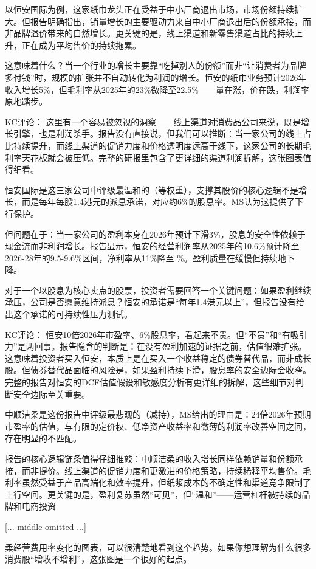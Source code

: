 \documentclass[11pt]{ctexart}
\begin{document}
以恒安国际为例，这家纸巾龙头正在受益于中小厂商退出市场，市场份额持续扩大。但报告明确指出，销量增长的主要驱动力来自中小厂商退出后的份额承接，而非品牌溢价带来的自然增长。更关键的是，线上渠道和新零售渠道占比的持续上升，正在成为平均售价的持续拖累。

这意味着什么？当一个行业的增长主要靠“吃掉别人的份额”而非“让消费者为品牌多付钱”时，规模的扩张并不自动转化为利润的增长。恒安的纸巾业务预计2026年收入增长5\%，但毛利率从2025年的23\%微降至22.5\%——量在涨，价在跌，利润率原地踏步。

KC评论： 这里有一个容易被忽视的洞察——线上渠道对消费品公司来说，既是增长引擎，也是利润杀手。报告没有直接说，但我们可以推断：当一家公司的线上占比持续提升，而线上渠道的促销力度和价格透明度远高于线下，这家公司的长期毛利率天花板就会被压低。完整的研报里包含了更详细的渠道利润拆解，这张图表值得细看。

恒安国际是这三家公司中评级最温和的（等权重），支撑其股价的核心逻辑不是增长，而是每年每股1.4港元的派息承诺，对应约6\%的股息率。MS认为这提供了下行保护。

但问题在于：当一家公司的盈利本身在2026年预计下滑3\%，股息的安全性依赖于现金流而非利润增长。报告显示，恒安的经营利润率从2025年的10.6\%预计降至2026-28年的9.5-9.6\%区间，净利率从11\%降至 \%。盈利质量在缓慢但持续地下降。

对于一个以股息为核心卖点的股票，投资者需要回答一个关键问题：如果盈利继续承压，公司是否愿意维持派息？恒安的承诺是“每年1.4港元以上”，但报告没有给出这个承诺的可持续性压力测试。

KC评论： 恒安10倍2026年市盈率、6\%股息率，看起来不贵。但“不贵”和“有吸引力”是两回事。报告隐含的判断是：在没有盈利加速的证据之前，估值很难扩张。这意味着投资者买入恒安，本质上是在买入一个收益稳定的债券替代品，而非成长股。但债券替代品面临的风险是，如果盈利持续下滑，股息率的安全边际会收窄。完整的报告对恒安的DCF估值假设和敏感度分析有更详细的拆解，这些细节对判断安全边际至关重要。

中顺洁柔是这份报告中评级最悲观的（减持），MS给出的理由是：24倍2026年预期市盈率的估值，与有限的定价权、低净资产收益率和微薄的利润率改善空间之间，存在明显的不匹配。

报告的核心逻辑链条值得仔细推敲：中顺洁柔的收入增长同样依赖销量和份额承接，而非提价。线上渠道的促销力度和更激进的价格策略，持续稀释平均售价。毛利率虽然受益于产品高端化和效率提升，但纸浆成本的不确定性和渠道竞争限制了上行空间。更关键的是，盈利复苏虽然“可见”，但“温和”——运营杠杆被持续的品牌和电商投资

[... middle omitted ...]

柔经营费用率变化的图表，可以很清楚地看到这个趋势。如果你想理解为什么很多消费股“增收不增利”，这张图是一个很好的起点。
\end{document}
